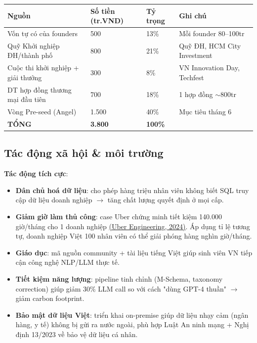 \documentclass[11pt,a4paper]{article}
\begin{document}
\begin{center}
\begin{tabular}{|L{4.5cm}|R{2.2cm}|R{1.5cm}|L{4.5cm}|}
\hline
{}\textbf{Nguồn} & \textbf{Số tiền (tr.VND)} & \textbf{Tỷ trọng} & \textbf{Ghi chú} \\ \hline
Vốn tự có của founders & 500 & 13\% & Mỗi founder 80--100tr \\ \hline
Quỹ Khởi nghiệp ĐH/thành phố & 800 & 21\% & Quỹ ĐH, HCM City Investment \\ \hline
Cuộc thi khởi nghiệp + giải thưởng & 300 & 8\% & VN Innovation Day, Techfest \\ \hline
DT hợp đồng thương mại đầu tiên & 700 & 18\% & 1 hợp đồng $\sim$800tr \\ \hline
Vòng Pre-seed (Angel) & 1.500 & 40\% & Mục tiêu tháng 6 \\ \hline
\textbf{TỔNG} & \textbf{3.800} & \textbf{100\%} & \\ \hline
\end{tabular}
\end{center}

\subsection{Tác động xã hội \& môi trường}

\textbf{Tác động tích cực}:
\begin{itemize}
\item \textbf{Dân chủ hoá dữ liệu}: cho phép hàng triệu nhân viên không biết SQL truy cập dữ liệu doanh nghiệp $\rightarrow$ tăng chất lượng quyết định ở mọi cấp.
\item \textbf{Giảm giờ làm thủ công}: case Uber chứng minh tiết kiệm 140.000 giờ/tháng cho 1 doanh nghiệp \href{https://www.uber.com/us/en/blog/query-gpt/}{(Uber Engineering, 2024)}. Áp dụng tỉ lệ tương tự, doanh nghiệp Việt 100 nhân viên có thể giải phóng hàng nghìn giờ/tháng.
\item \textbf{Giáo dục}: mã nguồn community + tài liệu tiếng Việt giúp sinh viên VN tiếp cận công nghệ NLP/LLM thực tế.
\item \textbf{Tiết kiệm năng lượng}: pipeline tinh chỉnh (M-Schema, taxonomy correction) giúp giảm 30\% LLM call so với cách "dùng GPT-4 thuần" $\rightarrow$ giảm carbon footprint.
\item \textbf{Bảo mật dữ liệu Việt}: triển khai on-premise giúp dữ liệu nhạy cảm (ngân hàng, y tế) không bị gửi ra nước ngoài, phù hợp Luật An ninh mạng + Nghị định 13/2023 về bảo vệ dữ liệu cá nhân.
\end{itemize}
\end{document}
